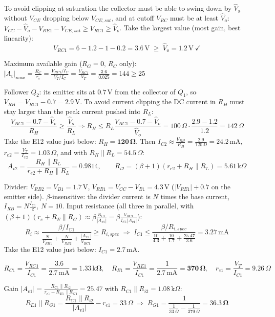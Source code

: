 \documentclass[11pt]{article}
\newcommand{\solstep}[2]{\par\medskip{\color{stepc}\textbf{Step #1 --- #2}}\par\nopagebreak}
\begin{document}
To avoid clipping at saturation the collector must be able to swing down by $\hat V_o$ without $V_{CE}$ dropping below $V_{CE,sat}$, and at cutoff $V_{RC}$ must be at least $\hat V_o$: $V_{CC} - \hat V_o - V_{RE1} - V_{CE,sat} \ge V_{RC1} \ge \hat V_o$. Take the largest value (most gain, best linearity): \[V_{RC1} = 6 - 1.2 - 1 - 0.2 = 3.6\,\mathrm{V} \;\ge\; \hat V_o = 1.2\,\mathrm{V}\ \checkmark\]

Maximum available gain ($R_G=0$, $R_C$ only): $|A_v|_{max} = \frac{R_C}{r_e} = \frac{V_{RC1}/I_C}{V_T/I_C} = \frac{V_{RC1}}{V_T} = \frac{3.6}{0.025} = 144 \ge 25$ \checkmark

Follower $Q_{2}$: its emitter sits at $0.7$\,V from the collector of $Q_{1}$, so $V_{RH} = V_{RC1} - 0.7 = 2.9\,\mathrm{V}$. To avoid current clipping the DC current in $R_H$ must stay larger than the peak current pushed into $R_L$: \[\frac{V_{RC1} - 0.7 - \hat V_o}{R_H} \ge \frac{\hat V_o}{R_L} \Rightarrow R_H \le R_L\frac{V_{RC1} - 0.7 - \hat V_o}{\hat V_o} = 100\,\Omega\cdot\frac{2.9 - 1.2}{1.2} = 142\,\Omega\]Take the E12 value just below: $R_H = \mathbf{120\,\Omega}$. Then $I_{C2} \approx \frac{V_{RH}}{R_H} = \frac{2.9}{120\,\Omega} = 24.2\,\mathrm{m}\mathrm{A}$, $r_{e2} = \frac{V_T}{I_{C2}} = 1.03\,\Omega$, and with $R_H \| R_L = 54.5\,\Omega$:\[A_{v2} = \frac{R_H\|R_L}{r_{e2} + R_H\|R_L} = 0.9814,\qquad R_{i2} = (\beta+1)(r_{e2} + R_H\|R_L) = 5.61\,\mathrm{k}\Omega\]
\solstep{3}{Bias current and resistors}Divider: $V_{RB2} = V_{B1} = 1.7\,\mathrm{V}$, $V_{RB1} = V_{CC} - V_{B1} = 4.3\,\mathrm{V}$ ($|V_{RE1}| + 0.7$ on the emitter side). $\beta$-insensitive: the divider current is $N$ times the base current, $I_{RB} = N\frac{I_{C1}}{\beta}$, $N = 10$. Input resistance (all three in parallel, with $(\beta+1)(r_e + R_E\|R_G) \approx \beta\frac{R_{C1}}{|A_{v1}|} = \beta\frac{V_{RC1}}{I_{C1}|A_{v1}|}$):\[R_i \approx \frac{\beta/I_{C1}}{\frac{N}{V_{RB1}} + \frac{N}{V_{RB2}} + \frac{|A_{v1}|}{V_{RC1}}} \ge R_{i,spec} \;\Rightarrow\; I_{C1} \le \frac{\beta/R_{i,spec}}{\frac{10}{4.3} + \frac{10}{1.7} + \frac{25.47}{3.6}} = 3.27\,\mathrm{m}\mathrm{A}\]Take the E12 value just below: $I_{C1} = 2.7\,\mathrm{m}\mathrm{A}$. 

\[R_{C1} = \frac{V_{RC1}}{I_{C1}} = \frac{3.6}{2.7\,\mathrm{m}\mathrm{A}} = \mathbf{1.33\,\mathrm{k}\Omega},\quad R_{E1} = \frac{V_{RE1}}{I_{C1}} = \frac{1}{2.7\,\mathrm{m}\mathrm{A}} = \mathbf{370\,\Omega},\quad r_{e1} = \frac{V_T}{I_{C1}} = 9.26\,\Omega\]

Gain $|A_{v1}| = \frac{R_{C1}\|R_{i2}}{r_{e1} + R_{E1}\|R_{G1}} = 25.47$ with $R_{C1}\|R_{i2} = 1.08\,\mathrm{k}\Omega$:\[R_{E1}\|R_{G1} = \frac{R_{C1}\|R_{i2}}{|A_{v1}|} - r_{e1} = 33\,\Omega \;\Rightarrow\; R_{G1} = \frac{1}{\frac{1}{33\,\Omega} - \frac{1}{370\,\Omega}} = \mathbf{36.3\,\Omega}\]
\end{document}
